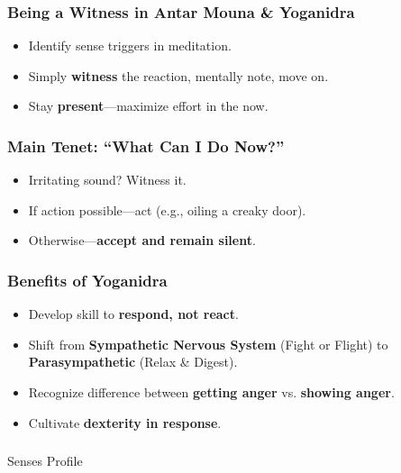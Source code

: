 \begin{frame}[fragile]\frametitle{Being a Witness in Antar Mouna \& Yoganidra}
      \begin{itemize}
      \item Identify sense triggers in meditation.
      \item Simply \textbf{witness} the reaction, mentally note, move on.
      \item Stay \textbf{present}—maximize effort in the now.
      \end{itemize}
\end{frame}

\begin{frame}[fragile]\frametitle{Main Tenet: “What Can I Do Now?”}
      \begin{itemize}
      \item Irritating sound? Witness it.
      \item If action possible—act (e.g., oiling a creaky door).
      \item Otherwise—\textbf{accept and remain silent}.
      \end{itemize}
\end{frame}

\begin{frame}[fragile]\frametitle{Benefits of Yoganidra}
      \begin{itemize}
      \item Develop skill to \textbf{respond, not react}.
      \item Shift from \textbf{Sympathetic Nervous System} (Fight or Flight) to \textbf{Parasympathetic} (Relax \& Digest).
      \item Recognize difference between \textbf{getting anger} vs. \textbf{showing anger}.
      \item Cultivate \textbf{dexterity in response}.
      \end{itemize}
\end{frame}

\begin{frame}[fragile]\frametitle{}
\begin{center}
{\Large Senses Profile}
\end{center}
\end{frame}


